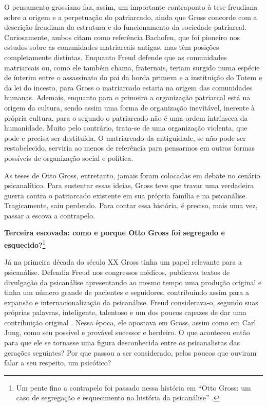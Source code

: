 O pensamento grossiano faz, assim, um importante contraponto à tese
freudiana sobre a origem e a perpetuação do patriarcado, ainda que Gross
concorde com a descrição freudiana da estrutura e do funcionamento da
sociedade patriarcal. Curiosamente, ambos citam como referência
Bachofen, que foi pioneiro nos estudos sobre as comunidades matriarcais
antigas, mas têm posições completamente distintas. Enquanto Freud
defende que as comunidades matriarcais ou, como ele também chama,
fraternais, teriam surgido numa espécie de ínterim entre o assassinato
do pai da horda primeva e a instituição do Totem e da lei do incesto,
para Gross o matriarcado estaria na origem das comunidades humanas.
Ademais, enquanto para o primeiro a organização patriarcal está na
origem da cultura, sendo assim uma forma de organização inevitável,
inerente à própria cultura, para o segundo o patriarcado não é uma ordem
intrínseca da humanidade. Muito pelo contrário, trata-se de uma
organização violenta, que pode e precisa ser destituída. O matriarcado
da antiguidade, se não pode ser restabelecido, serviria ao menos de
referência para pensarmos em outras formas possíveis de organização
social e política.

As teses de Otto Gross, entretanto, jamais foram colocadas em debate no
cenário psicanalítico. Para sustentar essas ideias, Gross teve que
travar uma verdadeira guerra contra o patriarcado existente em sua
própria família e na psicanálise. Tragicamente, saiu perdendo. Para
contar essa história, é preciso, mais uma vez, passar a escova a
contrapelo.

\textbf{Terceira escovada: como e porque Otto Gross foi segregado e
esquecido?}\footnote{Um pente fino a contrapelo foi passado nessa
  história em ``Otto Gross: um caso de segregação e esquecimento na
  história da psicanálise'' .}

Já na primeira década do século XX Gross tinha um papel relevante para a
psicanálise. Defendia Freud nos congressos médicos, publicava textos de
divulgação da psicanálise apresentando ao mesmo tempo uma produção
original e tinha um número grande de pacientes e seguidores,
contribuindo assim para a expansão e internacionalização da psicanálise.
Freud considerava-o, segundo suas próprias palavras, inteligente,
talentoso e um dos poucos capazes de dar uma contribuição original .
Nessa época, ele apostava em Gross, assim como em Carl Jung, como seu
possível e provável sucessor e herdeiro. O que aconteceu então para que
ele se tornasse uma figura desconhecida entre os psicanalistas das
gerações seguintes? Por que passou a ser considerado, pelos poucos que
ouviram falar a seu respeito, um psicótico?

